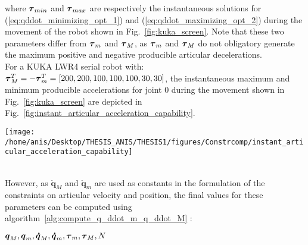 where $\mbox{\boldmath${\tau}$}_{min}$ and $\mbox{\boldmath${\tau}$}_{max}$ are respectively the instantaneous solutions for (\ref{eq:qddot_minimizing_opt_1}) and (\ref{eq:qddot_maximizing_opt_2}) during the movement of the robot shown in Fig.~\ref{fig:kuka_screen}. Note that these two parameters differ from  $\mbox{\boldmath${\tau}$}_{m}$ and $\mbox{\boldmath${\tau}$}_{M}$, as $\mbox{\boldmath${\tau}$}_{m}$ and $\mbox{\boldmath${\tau}$}_{M}$ do not obligatory generate the maximum positive and negative producible articular decelerations.\\
For a KUKA LWR4 serial robot with: $\mbox{\boldmath${\tau}$}_{M}^{T} = -\mbox{\boldmath${\tau}$}_{m}^{T} = [200,\allowbreak 200,\allowbreak 100,\allowbreak 100,\allowbreak 100,\allowbreak 30,\allowbreak 30]$, the instantaneous maximum and minimum producible accelerations for joint $0$ during the movement shown in Fig.~\ref{fig:kuka_screen} are depicted in Fig.~\ref{fig:instant_articular_acceleration_capability}. 
\begin{figure*}
\centering
\texttt{[image: /home/anis/Desktop/THESIS\_ANIS/THESIS1/figures/Constrcomp/instant\_articular\_acceleration\_capability]}
\caption{Instantaneous producible maximum and minimum articular accelerations for joint $0$ during the movement of the KUKA LWR4 as shown in Fig.~\ref{fig:kuka_screen}.}
\label{fig:instant_articular_acceleration_capability}
\end{figure*}\\
However, as  $\boldsymbol{\ddot{q}}_M$ and $\boldsymbol{\ddot{q}}_m$ are used as constants in the formulation of the constraints on articular velocity and position, the final values for these parameters can be computed using algorithm~\ref{alg:compute_q_ddot_m_q_ddot_M} :
\begin{algorithm}
\caption{Compute $\boldsymbol{\ddot{q}}_M$ and $\boldsymbol{\ddot{q}}_m$}
\label{alg:compute_q_ddot_m_q_ddot_M}
\begin{algorithmic}[1]
\Require $\mbox{\boldmath${q}$}_M, \mbox{\boldmath${q}$}_m, \mbox{\boldmath${\dot{q}}$}_{M},\mbox{\boldmath${\dot{q}}$}_{m}, \mbox{\boldmath${\tau}$}_m, \mbox{\boldmath${\tau}$}_M, N$
        \EndIf 
        \EndIf             
\EndFor
\myState {}\;
\end{algorithmic}
\end{algorithm}

